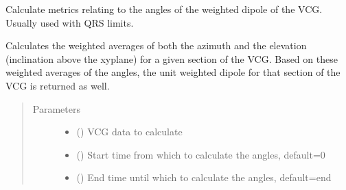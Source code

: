 \documentclass[letterpaper,10pt,english]{sphinxmanual}
\begin{document}
\begin{fulllineitems}
\label{\detokenize{_autosummary/signalanalysis.vcg.get_weighted_dipole_angles:signalanalysis.vcg.get_weighted_dipole_angles}}
\sphinxAtStartPar
Calculate metrics relating to the angles of the weighted dipole of the VCG. Usually used with QRS limits.

\sphinxAtStartPar
Calculates the weighted averages of both the azimuth and the elevation (inclination above the xy\sphinxhyphen{}plane) for a
given section of the VCG. Based on these weighted averages of the angles, the unit weighted dipole for that
section of the VCG is returned as well.
\begin{quote}\begin{description}
\item[{Parameters}] \leavevmode\begin{itemize}
\item {} 
\sphinxAtStartPar
{} () \textendash{} VCG data to calculate

\item {} 
\sphinxAtStartPar
{} (\sphinxstyleliteralemphasis{\sphinxupquote{, }}) \textendash{} Start time from which to calculate the angles, default=0

\item {} 
\sphinxAtStartPar
{} (\sphinxstyleliteralemphasis{\sphinxupquote{, }}) \textendash{} End time until which to calculate the angles, default=end


\end{itemize}
\end{description}
\end{quote}
\end{fulllineitems}
\end{document}
